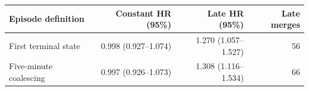 \begin{tabular}{lrrr}
\toprule
Episode definition & Constant HR (95\%) & Late HR (95\%) & Late merges \\
\midrule
First terminal state & 0.998 (0.927--1.074) & 1.270 (1.057--1.527) & 56 \\
Five-minute coalescing & 0.997 (0.926--1.073) & 1.308 (1.116--1.534) & 66 \\
\bottomrule
\end{tabular}
